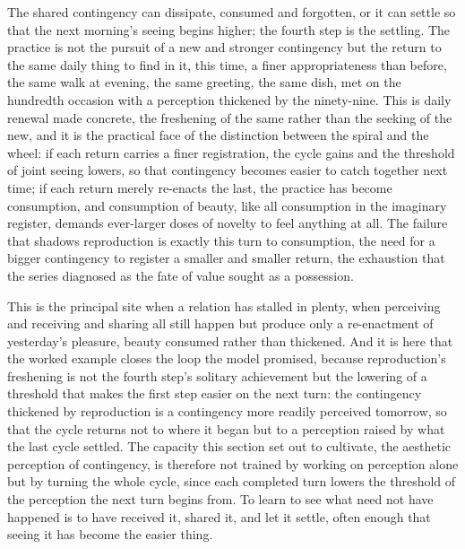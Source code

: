 The shared contingency can dissipate, consumed and forgotten, or it can settle so that the next morning's seeing begins higher; the fourth step is the settling. The practice is not the pursuit of a new and stronger contingency but the return to the same daily thing to find in it, this time, a finer appropriateness than before, the same walk at evening, the same greeting, the same dish, met on the hundredth occasion with a perception thickened by the ninety-nine. This is daily renewal made concrete, the freshening of the same rather than the seeking of the new, and it is the practical face of the distinction between the spiral and the wheel: if each return carries a finer registration, the cycle gains and the threshold of joint seeing lowers, so that contingency becomes easier to catch together next time; if each return merely re-enacts the last, the practice has become consumption, and consumption of beauty, like all consumption in the imaginary register, demands ever-larger doses of novelty to feel anything at all. The failure that shadows reproduction is exactly this turn to consumption, the need for a bigger contingency to register a smaller and smaller return, the exhaustion that the series diagnosed as the fate of value sought as a possession.

This is the principal site when a relation has stalled in plenty, when perceiving and receiving and sharing all still happen but produce only a re-enactment of yesterday's pleasure, beauty consumed rather than thickened. And it is here that the worked example closes the loop the model promised, because reproduction's freshening is not the fourth step's solitary achievement but the lowering of a threshold that makes the first step easier on the next turn: the contingency thickened by reproduction is a contingency more readily perceived tomorrow, so that the cycle returns not to where it began but to a perception raised by what the last cycle settled. The capacity this section set out to cultivate, the aesthetic perception of contingency, is therefore not trained by working on perception alone but by turning the whole cycle, since each completed turn lowers the threshold of the perception the next turn begins from. To learn to see what need not have happened is to have received it, shared it, and let it settle, often enough that seeing it has become the easier thing.


